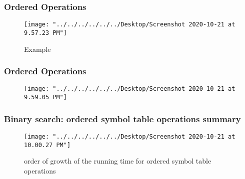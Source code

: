 \documentclass[11pt]{beamer}
\begin{document}
\begin{frame}
	\frametitle{Ordered Operations}
    \begin{figure}
    	\centering
    	\texttt{[image: "../../../../../../Desktop/Screenshot 2020-10-21 at 9.57.23 PM"]}
    	\caption{Example}
    	\label{fig:screenshot-2020-10-21-at-9}
    \end{figure}    	
\end{frame}

\begin{frame}
	\frametitle{Ordered Operations}
	\begin{figure}
		\centering
		\texttt{[image: "../../../../../../Desktop/Screenshot 2020-10-21 at 9.59.05 PM"]}
		\caption{}
		\label{fig:screenshot-2020-10-21-at-9}
	\end{figure}	
\end{frame}



\begin{frame}
	\frametitle{Binary search: ordered symbol table operations summary}
	\begin{figure}
		\centering
		\texttt{[image: "../../../../../../Desktop/Screenshot 2020-10-21 at 10.00.27 PM"]}
		\caption{order of growth of the running time for ordered symbol table operations}
		\label{fig:screenshot-2020-10-21-at-10}
	\end{figure}	
\end{frame}
\end{document}
